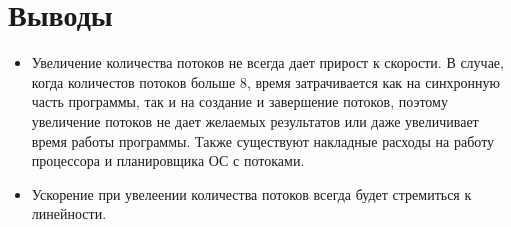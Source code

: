 \section{Выводы}
\begin{itemize}
\item Увеличение количества потоков не всегда дает прирост к скорости. В случае, когда количестов потоков больше 8, время затрачивается как на синхронную часть программы, так и на создание и завершение потоков, поэтому увеличение потоков не дает желаемых результатов или даже увеличивает время работы программы. Также существуют накладные расходы на работу процессора и планировщика ОС с потоками.
\item Ускорение при увелеении количества потоков всегда будет стремиться к линейности.
\end{itemize}
\pagebreak